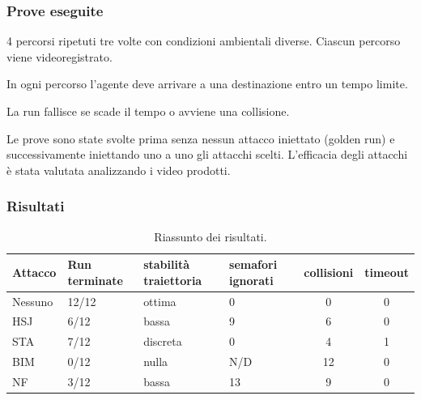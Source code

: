 \documentclass{beamer}
\begin{document}
\begin{frame}
    \frametitle{Prove eseguite}
    \begin{block}{\vspace*{-3ex}}
        4 percorsi ripetuti tre volte con condizioni ambientali diverse. Ciascun percorso viene videoregistrato.
    \end{block}
   
    \begin{block}{\vspace*{-3ex}}
        In ogni percorso l'agente deve arrivare a una destinazione entro un tempo limite.
    \end{block}
        
    \begin{block}{\vspace*{-3ex}}
        La run fallisce se scade il tempo o avviene una collisione.
    \end{block}
    \begin{block}{\vspace*{-3ex}}
        Le prove sono state svolte prima senza nessun attacco iniettato (golden run) e successivamente iniettando uno a uno gli attacchi scelti.
        L'efficacia degli attacchi è stata valutata analizzando i video prodotti.
    \end{block}
    
\end{frame}


\begin{frame}
    \frametitle{Risultati}
    \begin{table}[h]
        \centering
        \begin{tabular}{|p{1.5cm}|p{1.5cm}|p{2cm}|p{1.5cm}|c|c|}
            \hline
            Attacco        &   Run terminate    &   stabilità traiettoria    &  semafori ignorati        & collisioni & timeout\\
            \hline
            Nessuno        &  12/12               &   ottima        &  0                       & 0          & 0 \\
            HSJ            &  6/12                &   bassa         &  9                        & 6          & 0 \\
            STA            &  7/12                &   discreta      &  0                        & 4          & 1 \\
            BIM            &  0/12                &   nulla         &  N/D                      & 12         & 0\\
            NF             &  3/12                &   bassa         &   13                      & 9          & 0 \\
            \hline
        \end{tabular}
        \caption{Riassunto dei risultati.}
        \label{tab:ria}
    \end{table}
\end{frame}
\end{document}
